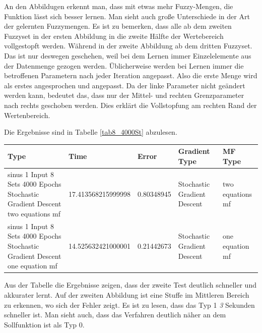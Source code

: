 An den Abbildugen erkennt man, dass mit etwas mehr Fuzzy-Mengen, die Funktion lässt sich besser lernen. Man sieht auch große Unterschiede in der Art der gelernten Fuzzymengen. Es ist zu bemerken, dass alle ab dem zweiten Fuzzyset in der ersten Abbildung in die zweite Hälfte der Wertebereich vollgestopft werden. Während in der zweite Abbildung ab dem dritten Fuzzyset. Das ist nur deswegen geschehen, weil bei dem Lernen immer Einzelelemente aus der Datenmenge gezogen werden. Üblicherweise werden bei Lernen immer die betroffenen Parametern nach jeder Iteration angepasst. Also die erste Menge wird als erstes angesprochen und angepasst. Da der linke Parameter nicht geändert werden kann, bedeutet das, dass nur der Mittel- und rechten Grenzparameter nach rechts geschoben werden. Dies erklärt die Vollstopfung am rechten Rand der Wertenbereich.

Die Ergebnisse sind in Tabelle \ref{tab8_4000St} abzulesen.

\begin{center}\label{tab8_4000St}
	\begin{tabular}{ | p{3cm} | l | l | p{3cm} | p{3cm} |}
		\hline
		Type & Time & Error & Gradient Type & MF Type \\ \hline
		sinus 1 Input 8 Sets 4000 Epochs Stochastic Gradient Descent two equations mf&17.413568215999998&0.80348945&Stochastic Gradient Descent&two equations mf \\ \hline
		sinus 1 Input 8 Sets 4000 Epochs Stochastic Gradient Descent one equation mf&14.525632421000001&0.21442673&Stochastic Gradient Descent&one equation mf\\ \hline
	\end{tabular}
\end{center}

Aus der Tabelle die Ergebnisse zeigen, dass der zweite Test deutlich schneller und akkurater lernt. Auf der zweiten Abbildung ist eine Stuffe im Mittleren Bereich zu erkennen, wo sich der Fehler zeigt. Es ist zu lesen, dass das Typ 1 \textit{3} Sekunden schneller ist. Man sieht auch, dass das Verfahren deutlich näher an dem Sollfunktion ist als Typ 0.

